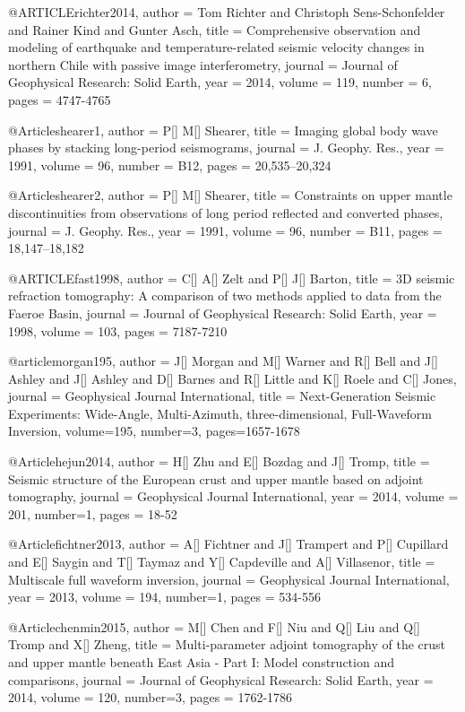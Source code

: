 @ARTICLE{richter2014,
  author = {Tom Richter and Christoph Sens-Schonfelder and  Rainer Kind and Gunter Asch},
  title = {Comprehensive observation and modeling of earthquake and temperature-related seismic velocity changes in northern Chile with passive image interferometry},
  journal = {Journal of Geophysical Research: Solid Earth},
  year = {2014},
  volume = {119},
  number = 6,
  pages = {4747-4765}
}



@Article{shearer1,
  author = 	 {P[] M[] Shearer},
  title = 	 {Imaging global body wave phases by stacking long-period seismograms},
  journal = 	 {J. Geophy. Res.},
  year = 	 1991,
  volume = 	 96,
  number = 	 {B12},
  pages = 	 {20,535--20,324}}

@Article{shearer2,
  author = 	 {P[] M[] Shearer},
  title = 	 {Constraints on upper mantle discontinuities from observations
	of long period reflected and converted phases},
  journal = 	 {J. Geophy. Res.},
  year = 	 1991,
  volume = 	 96,
  number = 	 {B11},
  pages = 	 {18,147--18,182}}


@ARTICLE{fast1998,
  author = {C[] A[] Zelt and P[] J[] Barton},
  title = {3D seismic refraction tomography: A comparison of two methods applied to data from the Faeroe Basin},
  journal = {Journal of Geophysical Research: Solid Earth},
  year = {1998},
  volume = {103},
  pages = {7187-7210}
}


@article{morgan195,
author = {J[] Morgan and M[] Warner and R[] Bell and J[] Ashley and J[] Ashley and D[] Barnes and R[] Little and K[] Roele and C[] Jones},
journal = {Geophysical Journal International},
title = {Next-Generation Seismic Experiments: Wide-Angle, Multi-Azimuth, three-dimensional, Full-Waveform Inversion},
volume=195,
number=3,
pages=1657-1678
}

@Article{hejun2014,
  author = 	 {H[] Zhu and E[] Bozdag and J[] Tromp},
  title = 	 {Seismic structure of the European crust and upper mantle based on adjoint tomography},
  journal = 	 {Geophysical Journal International},
  year = 	 2014,
  volume = 201,
  number=1,
  pages =	 {18-52}
}

@Article{fichtner2013,
  author = 	 {A[] Fichtner and J[] Trampert and P[] Cupillard and E[] Saygin and T[] Taymaz and Y[] Capdeville and A[] Villasenor},
  title = 	 {Multiscale full waveform inversion},
  journal = 	 {Geophysical Journal International},
  year = 	 2013,
  volume = 194,
  number=1,
  pages =	 {534-556}
}

@Article{chenmin2015,
  author = 	 {M[] Chen and F[] Niu and Q[] Liu and Q[] Tromp and X[] Zheng},
  title = 	 {Multi‐parameter adjoint tomography of the crust and upper mantle beneath {E}ast {A}sia - {P}art I: {M}odel construction and comparisons},
  journal = 	 {Journal of Geophysical Research: Solid Earth},
  year = 	 2014,
  volume = 120,
  number=3,
  pages =	 {1762-1786}
}


